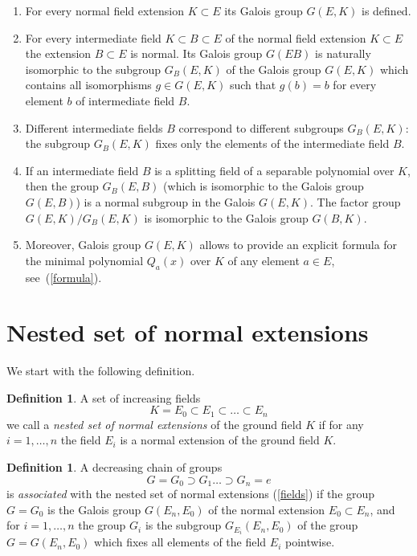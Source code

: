 \documentclass[11pt]{article}
\theoremstyle{plain}
\theoremstyle{definition}
\newtheorem{definition}[theorem]{Definition}
\begin{document}
 \begin{enumerate}

\item  For  every  normal field extension $K\subset E$ its Galois group $G(E,K)$ is defined.

\item For every intermediate field $K\subset B\subset E$ of the normal field extension $K\subset E$  the extension $B\subset E$ is normal. Its Galois group $G(EB)$ is naturally isomorphic to the subgroup $G_B(E,K)$ of the Galois group $G(E,K)$ which contains all isomorphisms $g\in G(E,K)$
    such that $g(b)=b$ for every element  $b$ of intermediate   field $B$.

\item   Different intermediate fields  $B$ correspond to different subgroups $G_B(E,K)$: the  subgroup  $G_B(E,K)$ fixes only the  elements of the   intermediate field $B$.

 \item If an intermediate field $B$ is a splitting field of a separable polynomial over $K$, then the group $G_B(E,B)$ (which is isomorphic to the Galois group $ G(E,B)$)  is a normal subgroup in the Galois  $G(E,K)$. The factor group $G(E,K)/G_B(E,K)$ is isomorphic to the Galois group $G(B,K)$.
     
\item Moreover, Galois group $G(E,K)$ allows to provide an explicit formula for the minimal polynomial $Q_a(x)$  over $K$ of any element $a\in E$, see~(\ref{formula}).
\end{enumerate}

\section{Nested set of normal extensions}

We start with the following definition.

\begin{definition}  A set of  increasing   fields
\begin{equation}\label{fields}
K=E_0\subset E_1\subset\dots\subset E_n
\end{equation}
we call  a   {\it nested set  of normal extensions} of the ground field $K$ if for any  $i= 1,\dots, n$ the  field
$E_i$ is a normal extension of the ground field $K$.
\end{definition}

\begin{definition}
A decreasing chain of groups
\begin{equation}\label{groups}
G=G_0\supset G_1\dots\supset G_n=e
\end{equation}
is {\it associated} with the nested set of normal extensions (\ref{fields}) if the group
$G=G_0$ is  the Galois group $G(E_n,E_0)$ of the normal extension $E_0\subset E_n$,
and for $i=1,\dots, n$ the group  $G_i$ is the  subgroup  $G_{E_i} (E_n,E_0)$ of the group $G=G(E_n,E_0)$ which fixes all elements of  the field  $E_i$ pointwise.
\end{definition}
\end{document}
